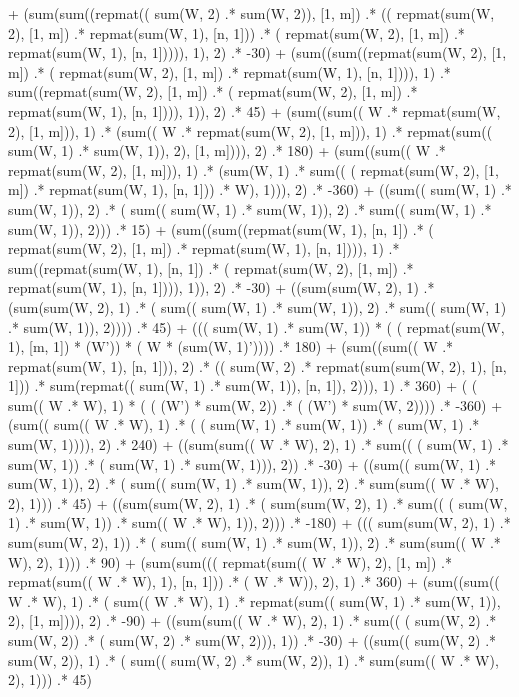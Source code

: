 \documentclass[]{article}
\begin{document}
  + (sum(sum((repmat(( sum(W, 2) .* sum(W, 2)), [1, m])  .* (( repmat(sum(W, 2), [1, m]) .* repmat(sum(W, 1), [n, 1]))  .* ( repmat(sum(W, 2), [1, m]) .* repmat(sum(W, 1), [n, 1])))), 1), 2)  .* -30) 
  + (sum((sum((repmat(sum(W, 2), [1, m])  .* ( repmat(sum(W, 2), [1, m]) .* repmat(sum(W, 1), [n, 1]))), 1)  .* sum((repmat(sum(W, 2), [1, m])  .* ( repmat(sum(W, 2), [1, m]) .* repmat(sum(W, 1), [n, 1]))), 1)), 2)  .* 45) 
  + (sum((sum(( W .* repmat(sum(W, 2), [1, m])), 1)  .* (sum(( W .* repmat(sum(W, 2), [1, m])), 1)  .* repmat(sum(( sum(W, 1) .* sum(W, 1)), 2), [1, m]))), 2)  .* 180) 
  + (sum((sum(( W .* repmat(sum(W, 2), [1, m])), 1)  .* (sum(W, 1)  .* sum(( ( repmat(sum(W, 2), [1, m]) .* repmat(sum(W, 1), [n, 1])) .* W), 1))), 2)  .* -360) 
  + ((sum(( sum(W, 1) .* sum(W, 1)), 2)  .* ( sum(( sum(W, 1) .* sum(W, 1)), 2) .* sum(( sum(W, 1) .* sum(W, 1)), 2)))  .* 15) 
  + (sum((sum((repmat(sum(W, 1), [n, 1])  .* ( repmat(sum(W, 2), [1, m]) .* repmat(sum(W, 1), [n, 1]))), 1)  .* sum((repmat(sum(W, 1), [n, 1])  .* ( repmat(sum(W, 2), [1, m]) .* repmat(sum(W, 1), [n, 1]))), 1)), 2)  .* -30) 
  + ((sum(sum(W, 2), 1)  .* (sum(sum(W, 2), 1)  .* ( sum(( sum(W, 1) .* sum(W, 1)), 2) .* sum(( sum(W, 1) .* sum(W, 1)), 2))))  .* 45) 
  + ((( sum(W, 1) .* sum(W, 1))  * ( ( repmat(sum(W, 1), [m, 1]) * (W')) * ( W * (sum(W, 1)'))))  .* 180) 
  + (sum((sum(( W .* repmat(sum(W, 1), [n, 1])), 2)  .* (( sum(W, 2) .* repmat(sum(sum(W, 2), 1), [n, 1]))  .* sum(repmat(( sum(W, 1) .* sum(W, 1)), [n, 1]), 2))), 1)  .* 360) 
  + ( ( sum(( W .* W), 1) * ( ( (W') * sum(W, 2)) .* ( (W') * sum(W, 2)))) .* -360) 
  + (sum(( sum(( W .* W), 1) .* ( ( sum(W, 1) .* sum(W, 1)) .* ( sum(W, 1) .* sum(W, 1)))), 2)  .* 240) 
  + ((sum(sum(( W .* W), 2), 1)  .* sum(( ( sum(W, 1) .* sum(W, 1)) .* ( sum(W, 1) .* sum(W, 1))), 2))  .* -30) 
  + ((sum(( sum(W, 1) .* sum(W, 1)), 2)  .* ( sum(( sum(W, 1) .* sum(W, 1)), 2) .* sum(sum(( W .* W), 2), 1)))  .* 45) 
  + ((sum(sum(W, 2), 1)  .* ( sum(sum(W, 2), 1) .* sum(( ( sum(W, 1) .* sum(W, 1)) .* sum(( W .* W), 1)), 2)))  .* -180) 
  + ((( sum(sum(W, 2), 1) .* sum(sum(W, 2), 1))  .* ( sum(( sum(W, 1) .* sum(W, 1)), 2) .* sum(sum(( W .* W), 2), 1)))  .* 90) 
  + (sum(sum((( repmat(sum(( W .* W), 2), [1, m]) .* repmat(sum(( W .* W), 1), [n, 1]))  .* ( W .* W)), 2), 1)  .* 360) 
  + (sum((sum(( W .* W), 1)  .* ( sum(( W .* W), 1) .* repmat(sum(( sum(W, 1) .* sum(W, 1)), 2), [1, m]))), 2)  .* -90) 
  + ((sum(sum(( W .* W), 2), 1)  .* sum(( ( sum(W, 2) .* sum(W, 2)) .* ( sum(W, 2) .* sum(W, 2))), 1))  .* -30) 
  + ((sum(( sum(W, 2) .* sum(W, 2)), 1)  .* ( sum(( sum(W, 2) .* sum(W, 2)), 1) .* sum(sum(( W .* W), 2), 1)))  .* 45) 
\end{document}
